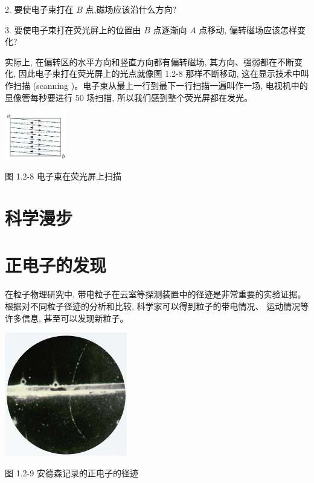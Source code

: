 \documentclass[10pt]{article}
\begin{document}
2. 要使电子束打在 \(B\) 点,磁场应该沿什么方向?

3. 要使电子束打在荧光屏上的位置由 \(B\) 点逐渐向 \(A\) 点移动, 偏转磁场应该怎样变化?

实际上, 在偏转区的水平方向和竖直方向都有偏转磁场, 其方向、强弱都在不断变化, 因此电子束打在荧光屏上的光点就像图 1.2-8 那样不断移动, 这在显示技术中叫作扫描 (scanning )。电子束从最上一行到最下一行扫描一遍叫作一场, 电视机中的显像管每秒要进行 50 场扫描, 所以我们感到整个荧光屏都在发光。

\begin{center}
\includegraphics[max width=0.2\textwidth]{images/01910e72-c5b7-7ed5-a6d4-fb3a5faefc32_16_708703.jpg}
\end{center}

图 1.2-8 电子束在荧光屏上扫描

\section*{科学漫步}

\section*{正电子的发现}

在粒子物理研究中, 带电粒子在云室等探测装置中的径迹是非常重要的实验证据。根据对不同粒子径迹的分析和比较, 科学家可以得到粒子的带电情况、 运动情况等许多信息, 甚至可以发现新粒子。

\begin{center}
\includegraphics[max width=0.4\textwidth]{images/01910e72-c5b7-7ed5-a6d4-fb3a5faefc32_16_482571.jpg}
\end{center}

图 1.2-9 安德森记录的正电子的径迹
\end{document}
